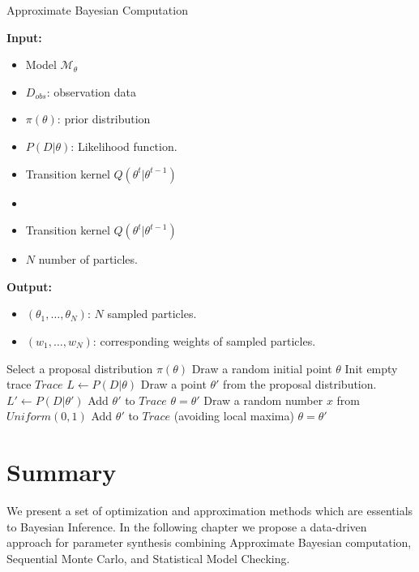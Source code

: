 \begin{algorithm}[H]
    \caption{Approximate Bayesian Computation}
    \label{alg:abc-reject}
    \hspace*{\algorithmicindent} \textbf{Input:}
    \begin{itemize}
        \item Model $\mathcal{M}_\theta$
        \item $D_{obs}$: observation data
        \item $\pi(\theta)$: prior distribution
        \item $P(D|\theta)$: Likelihood function.
        \item Transition kernel $Q(\theta^t|\theta^{t-1})$
        \item \item Transition kernel $Q(\theta^t|\theta^{t-1})$
        \item $N$ number of particles.
    \end{itemize}
    \hspace*{\algorithmicindent} \textbf{Output:}
    \begin{itemize}
        \item $(\theta_1,\ldots,\theta_N)$: $N$ sampled particles.
        \item $(w_1,\ldots,w_N)$: corresponding weights of sampled particles.
    \end{itemize}
    \begin{algorithmic}[1]
        \State Select a proposal distribution $\pi(\theta)$
        \State Draw a random initial point $\theta$
        \State Init empty trace $Trace$
        \State $L \leftarrow P(D|\theta)$
        \State Draw a point $\theta' $ from the proposal distribution.
        \State $L' \leftarrow P(D|\theta')$
        \State Add $\theta'$ to $Trace$
        \State $\theta = \theta'$
        \Else
        \State Draw a random number $x$ from $Uniform(0,1)$
        \State Add $\theta'$ to $Trace$ (avoiding local maxima)
        \State $\theta = \theta'$
        \EndIf
        \EndIf
        \EndWhile
        \EndProcedure
    \end{algorithmic}
\end{algorithm}

\section{Summary}
We present a set of optimization and approximation methods which are essentials to Bayesian
Inference. In the following chapter we propose a data-driven approach for parameter synthesis
combining Approximate Bayesian computation, Sequential Monte Carlo, and Statistical Model Checking.

